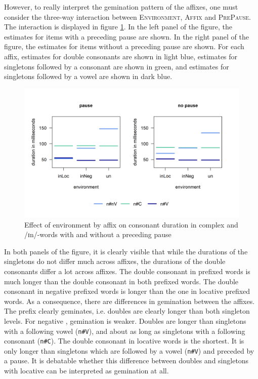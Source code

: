  However, to really interpret the gemination pattern of the affixes, one must consider the three-way interaction between \textsc{Environment}, \textsc{Affix} and \textsc{PrePause}. The interaction is displayed in figure \ref{fig:Un In experiment}. In the left panel of the figure, the estimates for items with a preceding pause are shown. In the right panel of the figure, the estimates for items without a preceding pause are shown. For each affix, estimates for double consonants are shown in light blue, estimates for singletons followed by a consonant are shown in green, and estimates for singletons followed by a vowel are shown in dark blue.






\begin{figure} [h!]
	\centering
	\includegraphics [scale=0.6] {images/Experiment/UnInInterEnvAffixPause1}
	\vspace*{-0.4cm}
	\caption{Effect of environment by affix on consonant duration in complex  and /ɪn/-words with and without a preceding pause}
	\label{fig:Un In experiment}
\end{figure}


In both panels of the figure, it is clearly visible that while the durations of the singletons do not differ much across affixes, the durations of the double consonants differ a lot across affixes. The double consonant in prefixed words is much longer than the double consonant in both prefixed words.
The double consonant in negative prefixed words is longer than the one in locative prefixed words. 
As a consequence, there are differences in gemination between the affixes. 
 The prefix  clearly geminates, i.e. doubles are clearly longer than both singleton levels. 
For negative , gemination is weaker. Doubles are longer than singletons with a following vowel (\texttt{n\#V}), and about as long as singletons with a following consonant (\texttt{n\#C}). 
The double consonant in locative words is the shortest. It is only longer than singletons which are followed by a vowel (\texttt{n\#V}) and preceded by a pause. It is debatable whether this difference between doubles and singletons with locative  can be interpreted as gemination at all.

